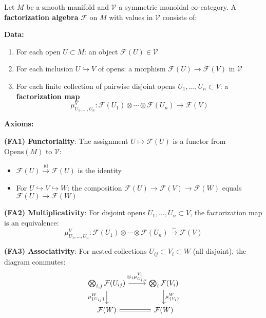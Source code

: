 \begin{definition}
\label{def:factorization-algebra-AF}
Let $M$ be a smooth manifold and $\mathcal{V}$ a symmetric monoidal $\infty$-category. 
A \textbf{factorization algebra} $\mathcal{F}$ on $M$ with values in $\mathcal{V}$ 
consists of:

\textbf{Data:}
\begin{enumerate}
\item For each open $U \subset M$: an object $\mathcal{F}(U) \in \mathcal{V}$

\item For each inclusion $U \hookrightarrow V$ of opens: a morphism 
   $\mathcal{F}(U) \to \mathcal{F}(V)$ in $\mathcal{V}$

\item For each finite collection of pairwise disjoint opens $U_1, \ldots, U_n \subset V$: 
   a \textbf{factorization map}
   $$\mu_{U_1,\ldots,U_n}^V: \mathcal{F}(U_1) \otimes \cdots \otimes \mathcal{F}(U_n) 
      \to \mathcal{F}(V)$$
\end{enumerate}

\textbf{Axioms:}

\textbf{(FA1) Functoriality}: The assignment $U \mapsto \mathcal{F}(U)$ is a functor 
from $\text{Opens}(M)$ to $\mathcal{V}$:
\begin{itemize}
\item $\mathcal{F}(U) \xrightarrow{\text{id}} \mathcal{F}(U)$ is the identity
\item For $U \hookrightarrow V \hookrightarrow W$: the composition 
   $\mathcal{F}(U) \to \mathcal{F}(V) \to \mathcal{F}(W)$ equals 
   $\mathcal{F}(U) \to \mathcal{F}(W)$
\end{itemize}

\textbf{(FA2) Multiplicativity}: For disjoint opens $U_1, \ldots, U_n \subset V$, 
the factorization map is an equivalence:
$$\mu_{U_1,\ldots,U_n}^V: \mathcal{F}(U_1) \otimes \cdots \otimes \mathcal{F}(U_n) 
   \xrightarrow{\sim} \mathcal{F}(V)$$

\textbf{(FA3) Associativity}: For nested collections 
$U_{ij} \subset V_i \subset W$ (all disjoint), the diagram commutes:
$$\begin{tikzcd}
\bigotimes_{i,j} \mathcal{F}(U_{ij}) 
   \arrow[r, "\otimes_i \mu_{U_{i,*}}^{V_i}"] 
   \arrow[d, "\mu_{\{U_{ij}\}}^W"'] &
\bigotimes_i \mathcal{F}(V_i) 
   \arrow[d, "\mu_{\{V_i\}}^W"] \\
\mathcal{F}(W) \arrow[r, equal] & \mathcal{F}(W)
\end{tikzcd}$$


\end{definition}
